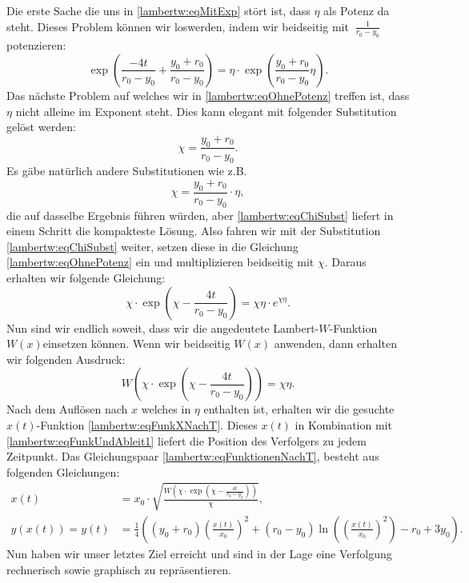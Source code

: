 Die erste Sache die uns in \eqref{lambertw:eqMitExp} stört ist, dass \(\eta\) als Potenz da steht. Dieses Problem können wir loswerden, indem wir beidseitig mit \(\:\displaystyle \frac{1}{r_0-y_0}\:\) potenzieren:
\begin{equation}
	\operatorname{exp}\left(\displaystyle \frac{-4t}{r_0-y_0}+\frac{y_0+r_0}{r_0-y_0}\right)
	=
	\eta\cdot \operatorname{exp}\left(\displaystyle \frac{y_0+r_0}{r_0-y_0}\eta\right).
	\label{lambertw:eqOhnePotenz}
\end{equation}
Das nächste Problem auf welches wir in \eqref{lambertw:eqOhnePotenz} treffen ist, dass \(\eta\) nicht alleine im Exponent steht. Dies kann elegant mit folgender Substitution gelöst werden:
\begin{equation}
	\chi
	=
	\frac{y_0+r_0}{r_0-y_0}.
	\label{lambertw:eqChiSubst}
\end{equation}
Es gäbe natürlich andere Substitutionen wie z.B. 
\[\displaystyle \chi=\frac{y_0+r_0}{r_0-y_0}\cdot\eta,\] 
die auf dasselbe Ergebnis führen würden, aber \eqref{lambertw:eqChiSubst} liefert in einem Schritt die kompakteste Lösung. Also fahren wir mit der Substitution \eqref{lambertw:eqChiSubst} weiter, setzen diese in die Gleichung \eqref{lambertw:eqOhnePotenz} ein und multiplizieren beidseitig mit \(\chi\). Daraus erhalten wir folgende Gleichung:
\begin{equation}
	\chi\cdot \operatorname{exp}\left(\displaystyle \chi-\frac{4t}{r_0-y_0}\right)
	=
	\chi\eta\cdot e^{\displaystyle \chi\eta}.
	\label{lambertw:eqNachSubst}
\end{equation}
Nun sind wir endlich soweit, dass wir die angedeutete Lambert-\(W\)-Funktion \(W(x)\)einsetzen können. Wenn wir beidseitig \(W(x)\) anwenden, dann erhalten wir folgenden Ausdruck:
\begin{equation}
	W\left(\chi\cdot \operatorname{exp}\left(\displaystyle \chi-\frac{4t}{r_0-y_0}\right)\right)
	=
	\chi\eta.
\end{equation}
Nach dem Auflösen nach \(x\) welches in \(\eta\) enthalten ist, erhalten wir die gesuchte \(x(t)\)-Funktion \eqref{lambertw:eqFunkXNachT}. Dieses \(x(t)\) in Kombination mit \eqref{lambertw:eqFunkUndAbleit1} liefert die Position des Verfolgers zu jedem Zeitpunkt. Das Gleichungspaar \eqref{lambertw:eqFunktionenNachT}, besteht aus folgenden Gleichungen:
\begin{subequations}
	\begin{align}
		\label{lambertw:eqFunkXNachT}
		x(t)
		&=
		x_0\cdot\sqrt{\frac{W\left(\chi\cdot \operatorname{exp}\left(\displaystyle \chi-\frac{4t}{r_0-y_0}\right)\right)}{\chi}}, \\
		\label{lambertw:eqFunkYNachT}
		y(x(t))
		=
		y(t)
		&=
		\frac{1}{4}\left(\left(y_0+r_0\right)\left(\frac{x(t)}{x_0}\right)^2+\left(r_0-y_0\right)\operatorname{ln}\left(\left(\frac{x(t)}{x_0}\right)^2\right)-r_0+3y_0\right).
	\end{align}
	\label{lambertw:eqFunktionenNachT}
\end{subequations}
Nun haben wir unser letztes Ziel erreicht und sind in der Lage eine Verfolgung rechnerisch sowie graphisch zu repräsentieren.

